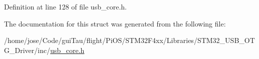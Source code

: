 Definition at line 128 of file usb\-\_\-core.\-h.



The documentation for this struct was generated from the following file\-:\begin{DoxyCompactItemize}
\item 
/home/jose/\-Code/gui\-Tau/flight/\-Pi\-O\-S/\-S\-T\-M32\-F4xx/\-Libraries/\-S\-T\-M32\-\_\-\-U\-S\-B\-\_\-\-O\-T\-G\-\_\-\-Driver/inc/\hyperlink{_s_t_m32_f4xx_2_libraries_2_s_t_m32___u_s_b___o_t_g___driver_2inc_2usb__core_8h}{usb\-\_\-core.\-h}\end{DoxyCompactItemize}

